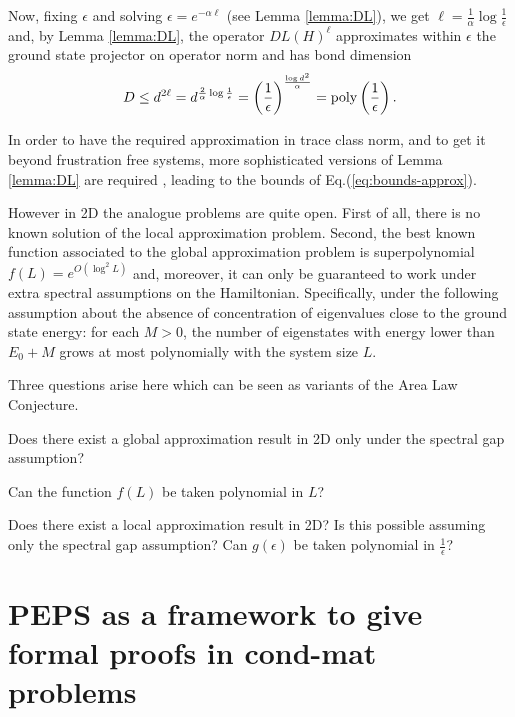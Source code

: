 \documentclass[smallextended]{svjour3}
\renewcommand{\1}{\mathbbm{1}}
\begin{document}
Now, fixing $\epsilon$ and solving $\epsilon= e^{-\alpha\ell}$ (see Lemma \ref{lemma:DL}), we get $\ell= \frac{1}{\alpha}\log\frac{1}{\epsilon}$ and, by Lemma \ref{lemma:DL}, the operator $DL(H)^\ell$ approximates within $\epsilon$ the ground state projector on operator norm and has bond dimension
$$D\le d^{2\ell}=d^{\frac{2}{\alpha}\log\frac{1}{\epsilon}}= \left(\frac{1}{\epsilon}\right)^{\frac{\log d^2}{\alpha}}={\rm poly}\left(\frac{1}{\epsilon}\right).$$


In order to have the required approximation in trace class norm, and to get it beyond frustration free systems, more sophisticated versions of Lemma \ref{lemma:DL} are required \cite{Arad2013}, leading to the bounds of Eq.(\ref{eq:bounds-approx}).


However in 2D the analogue problems are quite open. First of all, there is no known solution of the local approximation problem. Second, the best known function associated to the global approximation problem is superpolynomial $f(L)=e^{O(\log^2 L)}$ and, moreover, it can only be guaranteed to work under extra spectral assumptions on the Hamiltonian. Specifically, under the following assumption about the absence of concentration of eigenvalues close to the ground state energy: for each $M>0$, the number of eigenstates with energy lower than $E_0+M$ grows at most polynomially with the system size $L$.

Three questions arise here which can be seen as variants of the Area Law Conjecture.

\begin{question}
    Does there exist a global approximation result in 2D only under the spectral gap assumption?
\end{question}

\begin{question}
    Can the function $f(L)$ be taken polynomial in $L$?
\end{question}

\begin{question}
    Does there exist a local approximation result in 2D? Is this possible assuming only the spectral gap assumption? Can $g(\epsilon)$ be taken polynomial in $\frac{1}{\epsilon}$?
\end{question}







\section{PEPS as a framework to give formal proofs in cond-mat problems}
\end{document}
